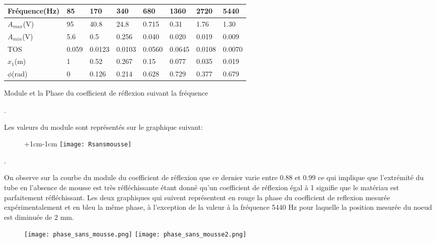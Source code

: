 \documentclass[a4paper,11pt]{article}
\begin{document}
\begin{table}[!hbp]
\begin{adjustwidth}{-1.8cm}{-1cm}
\begin{tabular}{|C{2.3cm}|C{1.5cm}|C{1.5cm}|C{1.5cm}|C{1.5cm}|C{1.5cm}|C{1.5cm}|C{1.5cm}|}
\hline Fréquence(Hz) & 85 & 170 & 340 & 680 & 1360 & 2720 & 5440 \\
\hline $A_{max}$(V) & 95 & 40.8 & 24.8 & 0.715 & 0.31 & 1.76 & 1.30 \\
\hline $A_{min}$(V) & 5.6 & 0.5 & 0.256 & 0.040 & 0.020 & 0.019 & 0.009 \\
\hline TOS & 0.059 & 0.0123 & 0.0103 & 0.0560 & 0.0645 & 0.0108 & 0.0070 \\
\hline $x_{1}$(m) & 1 & 0.52 & 0.267 & 0.15 & 0.077 & 0.035 & 0.019 \\
\hline $\phi$(rad) & 0 & 0.126 & 0.214 & 0.628 & 0.729 & 0.377 & 0.679 \\
\hline
\end{tabular}
\end{adjustwidth}
\caption{}{Module et la Phase du coefficient de réflexion suivant la fréquence}
\end{table}

.
\newline
\newline

Les valeurs du module sont représentés sur le graphique suivant:

\begin{figure}[h]
\begin{adjustwidth}{+1cm}{-1cm}
\texttt{[image: Rsansmousse]}
\end{adjustwidth}
\end{figure}
.
\newline

On observe sur la courbe du module du coefficient de réflexion que ce dernier varie entre 0.88 et 0.99 ce qui implique que l'extrémité du tube en l'absence de mousse est très réfléchissante étant donné qu'un coefficient de réflexion égal à 1 signifie que le matériau est parfaitement réfléchissant.
\newline
\newline
Les deux graphiques qui suivent représentent en rouge la phase du coefficient de reflexion mesurée expérimentalement et en bleu la même phase, à l'exception de la valeur à la fréquence 5440 Hz pour laquelle la position mesurée du noeud est diminuée de 2 mm.

\begin{figure}[h]
\begin{adjustwidth}{-0cm}{ 0cm}
\texttt{[image: phase\_sans\_mousse.png]}  \texttt{[image: phase\_sans\_mousse2.png]}
\end{adjustwidth}
\end{figure}
\end{document}
